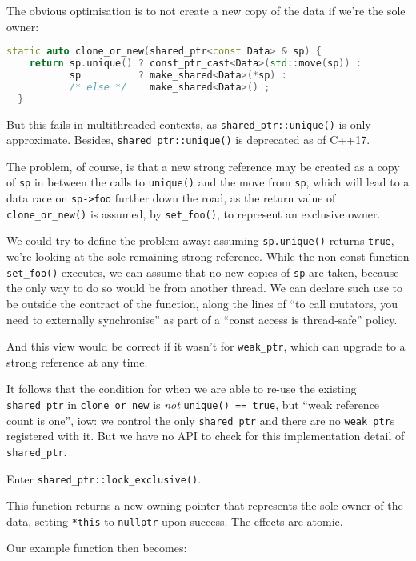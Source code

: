 \documentclass[11pt]{article}
\newcommand{\lockx}{\texttt{lock\_exclusive()}}
\newcommand{\sptr}{\texttt{shared\_ptr}}
\newcommand{\sptrlockx}{\texttt{\sptr::\lockx}}
\begin{document}
The obvious optimisation is to not create a new copy of the data if
we're the sole owner:

\begin{lstlisting}[language=C++,label={lst:clone-or-new-using-unique},caption={\texttt{clone\_or\_new()} using \texttt{unique()}}]
  static auto clone_or_new(shared_ptr<const Data> & sp) {
    return sp.unique() ? const_ptr_cast<Data>(std::move(sp)) :
           sp          ? make_shared<Data>(*sp) :
           /* else */    make_shared<Data>() ;
  }
\end{lstlisting}

But this fails in multithreaded contexts, as \texttt{\sptr::unique()}
is only approximate. Besides, \texttt{\sptr::unique()} is deprecated
as of C++17.

The problem, of course, is that a new strong reference may be created
as a copy of \texttt{sp} in between the calls to \texttt{unique()} and
the move from \texttt{sp}, which will lead to a data race on
\texttt{sp->foo} further down the road, as the return value of
\texttt{clone\_or\_new()} is assumed, by \texttt{set\_foo()}, to
represent an exclusive owner.

We could try to define the problem away: assuming \texttt{sp.unique()}
returns \texttt{true}, we're looking at the sole remaining strong
reference. While the non-const function \texttt{set\_foo()} executes,
we can assume that no new copies of \texttt{sp} are taken, because the
only way to do so would be from another thread. We can declare such
use to be outside the contract of the function, along the lines of
``to call mutators, you need to externally synchronise'' as part of a
``const access is thread-safe'' policy.

And this view would be correct if it wasn't for \texttt{weak\_ptr},
which can upgrade to a strong reference at any time.

It follows that the condition for when we are able to re-use the
existing \sptr{} in \texttt{clone\_or\_new} is \emph{not}
\texttt{unique() == true}, but ``weak reference count is one'', iow: we
control the only \sptr{} and there are no \texttt{weak\_ptr}s registered
with it. But we have no API to check for this implementation detail of
\sptr.

Enter \sptrlockx.

This function returns a new owning pointer that represents the sole
owner of the data, setting \texttt{*this} to \texttt{nullptr} upon
success. The effects are atomic.

Our example function then becomes:
\end{document}
